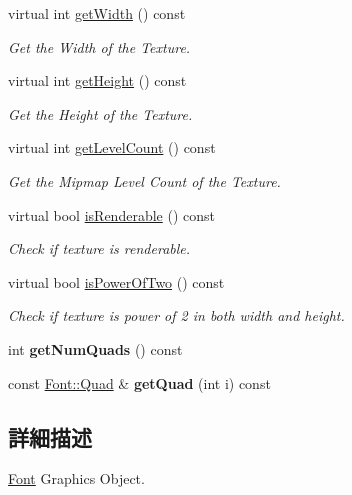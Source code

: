 \begin{DoxyCompactItemize}
\item 
virtual int \hyperlink{class_magnum_1_1_font_a29554be6eae3bf01854205b373b87d4c}{get\+Width} () const 
\begin{DoxyCompactList}\small\item\em Get the Width of the Texture. \end{DoxyCompactList}\item 
virtual int \hyperlink{class_magnum_1_1_font_a95544f5096b7b11ed4bd82e5888bf32b}{get\+Height} () const 
\begin{DoxyCompactList}\small\item\em Get the Height of the Texture. \end{DoxyCompactList}\item 
virtual int \hyperlink{class_magnum_1_1_font_ab31bc3961d87559fb2bec990eb2ea74e}{get\+Level\+Count} () const 
\begin{DoxyCompactList}\small\item\em Get the Mipmap Level Count of the Texture. \end{DoxyCompactList}\item 
virtual bool \hyperlink{class_magnum_1_1_font_a2925b8c1b04096d45cc37bcce6980599}{is\+Renderable} () const 
\begin{DoxyCompactList}\small\item\em Check if texture is renderable. \end{DoxyCompactList}\item 
virtual bool \hyperlink{class_magnum_1_1_font_af3cd04a5fad1746998deb5c8f2cb1553}{is\+Power\+Of\+Two} () const 
\begin{DoxyCompactList}\small\item\em Check if texture is power of 2 in both width and height. \end{DoxyCompactList}\item 
int {\bfseries get\+Num\+Quads} () const \hypertarget{class_magnum_1_1_font_a823b7635f9df8b86502524a00d160ec9}{}\label{class_magnum_1_1_font_a823b7635f9df8b86502524a00d160ec9}

\item 
const \hyperlink{class_magnum_1_1_font_1_1_quad}{Font\+::\+Quad} \& {\bfseries get\+Quad} (int i) const \hypertarget{class_magnum_1_1_font_aa1e6b0913b666bec5d39f791d943ad20}{}\label{class_magnum_1_1_font_aa1e6b0913b666bec5d39f791d943ad20}

\end{DoxyCompactItemize}


\subsection{詳細描述}
\hyperlink{class_magnum_1_1_font}{Font} Graphics Object. 

